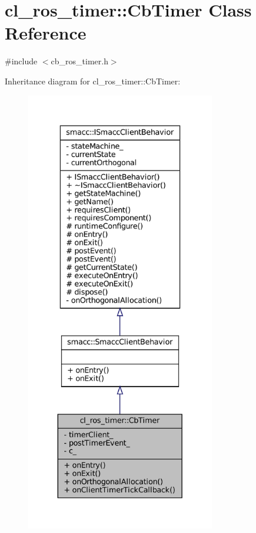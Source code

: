\hypertarget{classcl__ros__timer_1_1CbTimer}{}\section{cl\+\_\+ros\+\_\+timer\+:\+:Cb\+Timer Class Reference}
\label{classcl__ros__timer_1_1CbTimer}


{\ttfamily \#include $<$cb\+\_\+ros\+\_\+timer.\+h$>$}



Inheritance diagram for cl\+\_\+ros\+\_\+timer\+:\+:Cb\+Timer\+:
\nopagebreak
\begin{figure}[H]
\begin{center}
\leavevmode
\includegraphics[height=550pt]{classcl__ros__timer_1_1CbTimer__inherit__graph}
\end{center}
\end{figure}


